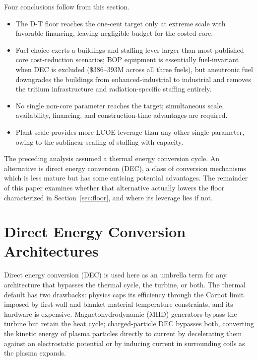 \documentclass{article}
\begin{document}
Four conclusions follow from this section.
\begin{itemize}
\item The D-T floor reaches the one-cent target only at extreme
scale with favorable financing, leaving negligible budget for the
costed core.
\item Fuel choice exerts a buildings-and-staffing lever larger than
most published core cost-reduction scenarios; BOP equipment is
essentially fuel-invariant when DEC is excluded (\$386--393M
across all three fuels), but aneutronic fuel downgrades the
buildings from enhanced-industrial to industrial and removes the
tritium infrastructure and radiation-specific staffing entirely.
\item No single non-core parameter reaches the target; simultaneous
scale, availability, financing, and construction-time advantages
are required.
\item Plant scale provides more LCOE leverage than any other single
parameter, owing to the sublinear scaling of staffing with capacity.
\end{itemize}

The preceding analysis assumed a thermal energy conversion cycle.
An alternative is direct energy conversion (DEC), a class of conversion mechanisms
which is less mature but has some enticing potential advantages.
The remainder of
this paper examines whether that alternative actually lowers the
floor characterized in Section~\ref{sec:floor}, and where its
leverage lies if not.

\section{Direct Energy Conversion Architectures}
\label{sec:dec}

Direct energy conversion (DEC) is used here as an umbrella term for
any architecture that bypasses the thermal cycle, the turbine, or
both. The thermal default has two drawbacks: physics caps its
efficiency through the Carnot limit imposed by first-wall and
blanket material temperature constraints, and its hardware is expensive.
Magnetohydrodynamic (MHD) generators bypass the turbine but retain
the heat cycle; charged-particle DEC bypasses both, converting the
kinetic energy of plasma particles directly to current by
decelerating them against an electrostatic potential or by inducing
current in surrounding coils as the plasma expands.
\end{document}
